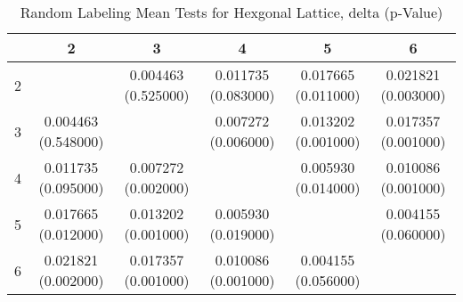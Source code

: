 \begin{table}
\centering
\caption{Random Labeling Mean Tests for Hexgonal Lattice,  delta (p-Value)}
\label{randomLabelTable}
\begin{tabular}{|c||c|c|c|c|c|}
\hline
&2&3&4&5&6\\
\hline
\hline
2& & 0.004463 (0.525000)& 0.011735 (0.083000)& 0.017665 (0.011000)& 0.021821
(0.003000)\\
\hline
3& 0.004463 (0.548000)& & 0.007272 (0.006000)& 0.013202 (0.001000)& 0.017357
(0.001000)\\
\hline
4& 0.011735 (0.095000)& 0.007272 (0.002000)& & 0.005930 (0.014000)& 0.010086
(0.001000)\\
\hline
5& 0.017665 (0.012000)& 0.013202 (0.001000)& 0.005930 (0.019000)& & 0.004155
(0.060000)\\
\hline
6& 0.021821 (0.002000)& 0.017357 (0.001000)& 0.010086 (0.001000)& 0.004155
(0.056000)& \\
\hline
\end{tabular} \end{table}





